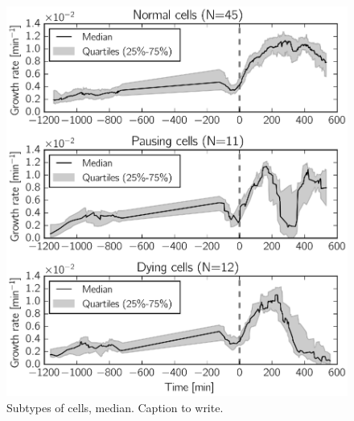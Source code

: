 \begin{figure}[p]
\centering
\includegraphics[scale=1]{./Fig/subcat_median}
\caption{Subtypes of cells, median. Caption to write.}
\label{fig:subcat_median}
\end{figure}